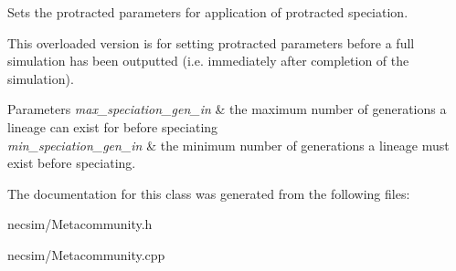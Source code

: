 Sets the protracted parameters for application of protracted speciation. 

This overloaded version is for setting protracted parameters before a full simulation has been outputted (i.\+e. immediately after completion of the simulation).


\begin{DoxyParams}{Parameters}
{\em max\+\_\+speciation\+\_\+gen\+\_\+in} & the maximum number of generations a lineage can exist for before speciating \\
\hline
{\em min\+\_\+speciation\+\_\+gen\+\_\+in} & the minimum number of generations a lineage must exist before speciating. \\
\hline
\end{DoxyParams}


The documentation for this class was generated from the following files\+:\begin{DoxyCompactItemize}
\item 
necsim/Metacommunity.\+h\item 
necsim/Metacommunity.\+cpp\end{DoxyCompactItemize}
